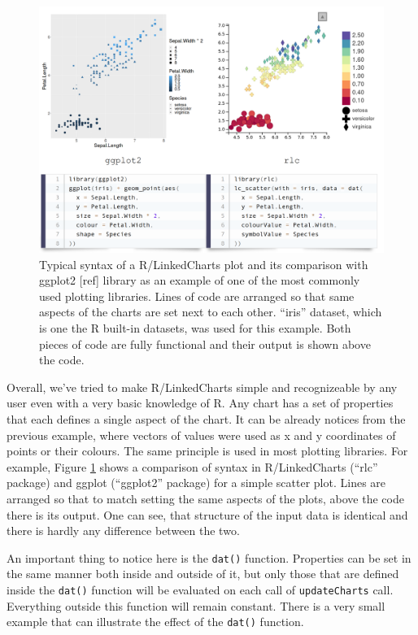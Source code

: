 \documentclass[twocolumn,10pt]{article}
\begin{document}
\begin{figure}
	\includegraphics[width=\textwidth]{FigB/figB.png}
	\caption{Typical syntax of a R/LinkedCharts plot and its comparison with ggplot2 [ref] library as an example of one of the most commonly used plotting libraries. Lines of code are arranged so that same aspects of the charts are set next to each other. ``iris'' dataset, which is one the R built-in datasets, was used for this example. Both pieces of code are fully functional and their output is shown above the code.}
	\label{FigB}
\end{figure}

Overall, we've tried to make R/LinkedCharts simple and recognizeable by any user even with a very basic knowledge of R. Any chart has a set of properties that each defines a single aspect of the chart. It can be already notices from the previous example, where vectors of values were used as x and y coordinates of points or their colours. The same principle is used in most plotting libraries. For example, Figure \ref{FigB} shows a comparison of syntax in R/LinkedCharts (``rlc'' package) and ggplot (``ggplot2'' package) for a simple scatter plot. Lines are arranged so that to match setting the same aspects of the plots, above the code there is its output. One can see, that structure of the input data is identical and there is hardly any difference between the two.

An important thing to notice here is the \texttt{dat()} function. Properties can be set in the same manner both inside and outside of it, but only those that are defined inside the \texttt{dat()} function will be evaluated on each call of \texttt{updateCharts} call. Everything outside this function will remain constant. There is a very small example that can illustrate the effect of the \texttt{dat()} function.
\end{document}
